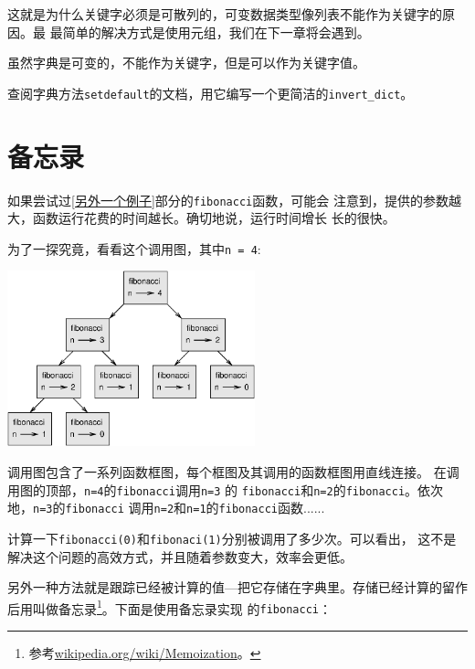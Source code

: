 这就是为什么关键字必须是可散列的，可变数据类型像列表不能作为关键字的原因。最
最简单的解决方式是使用元组，我们在下一章将会遇到。

虽然字典是可变的，不能作为关键字，但是可以作为关键字值。

\begin{ex}
查阅字典方法{\tt setdefault}的文档，用它编写一个更简洁的\verb"invert_dict"。


\end{ex}




\section{备忘录}

如果尝试过\ref{另外一个例子}部分的{\tt fibonacci}函数，可能会
注意到，提供的参数越大，函数运行花费的时间越长。确切地说，运行时间增长
长的很快。


为了一探究竟，看看这个调用图，其中{\tt n = 4}:

\beforefig
\centerline{\includegraphics[height=2in]{figs/fibonacci.eps}}
\afterfig


调用图包含了一系列函数框图，每个框图及其调用的函数框图用直线连接。
在调用图的顶部，{\tt n=4}的{\tt fibonacci}调用{\tt n=3} 的
{\tt fibonacci}和{\tt n=2}的{\tt fibonacci}。依次地，{\tt n=3}的{\tt fibonacci}
调用{\tt n=2}和{\tt n=1}的{\tt fibonacci}函数......


计算一下{\tt fibonacci(0)}和{\tt fibonaci(1)}分别被调用了多少次。可以看出，
这不是解决这个问题的高效方式，并且随着参数变大，效率会更低。


另外一种方法就是跟踪已经被计算的值---把它存储在字典里。存储已经计算的留作后用叫做备忘录\footnote{参考\url{wikipedia.org/wiki/Memoization}。}。下面是使用备忘录实现
的{\tt fibonacci}：

